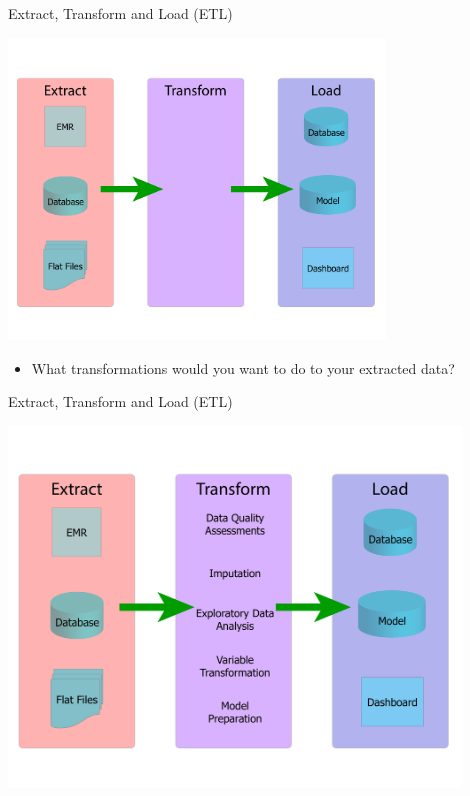 \documentclass[10pt, xcolor=table]{beamer}
\begin{document}
\begin{frame}{Extract, Transform and Load (ETL)}
	\begin{center}
		\includegraphics[width=0.75\textwidth]{images/etl_wo_transormations.pdf}
	\end{center}	
	\begin{itemize}
		\item What transformations would you want to do to your extracted data?
	\end{itemize}
\end{frame}


\begin{frame}{Extract, Transform and Load (ETL)}
	\begin{center}
		\includegraphics[width=0.9\textwidth]{images/etl.pdf}
	\end{center}	
\end{frame}
\end{document}
